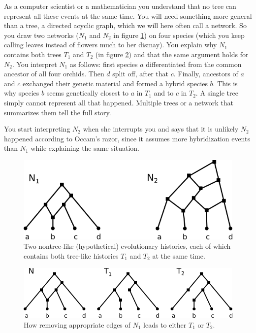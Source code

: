 As a computer scientist or a mathematician you understand that no tree can represent all these events at the same time. You will need something more general than a tree, a directed acyclic graph, which we will here often call a network. So you draw two networks ($N_1$ and $N_2$ in figure \ref{fig:toyex1}) on four species (which you keep calling leaves instead of flowers much to her dismay). You explain why $N_1$ contains both trees $T_1$ and $T_2$ (in figure \ref{fig:toyex2}) and that the same argument holds for $N_2$.  You interpret $N_1$ as follows: first species $a$ differentiated from the common ancestor of all four orchids. Then $d$ split off, after that $c$. Finally, ancestors of $a$ and $c$ exchanged their genetic material and formed a hybrid species $b$. This is why species $b$ seems genetically closest to $a$ in $T_1$ and to $c$ in $T_2$. A single tree simply cannot represent all that happened. Multiple trees or a network that summarizes them tell the full story. 

You start interpreting $N_2$ when she interrupts you and says that it is unlikely $N_2$ happened according to Occam's razor, since it assumes more hybridization events than $N_1$ while explaining the same situation.

  \begin{figure}[h]
    \centering
    \includegraphics[scale=0.5]{../figs/ch1/toyex2.png}
    \caption{Two nontree-like (hypothetical) evolutionary histories, each of which contains both tree-like histories $T_1$ and $T_2$ at the same time.}
    \label{fig:toyex1}
  \end{figure}
  
    \begin{figure}[h]
    \centering
    \includegraphics[scale=0.5]{../figs/ch1/toyex1.png}
    \caption{How removing appropriate edges of $N_1$ leads to either $T_1$ or $T_2$.}
    \label{fig:toyex2}
  \end{figure}

